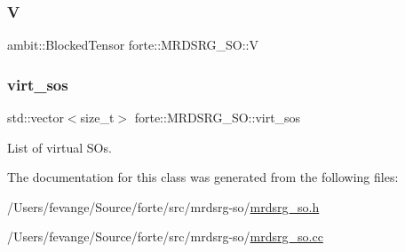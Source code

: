 \mbox{\label{classforte_1_1_m_r_d_s_r_g___s_o_a5282fcd5394254c50c626ad36dd6c0cd}} 
\subsubsection{\texorpdfstring{V}{V}}
{\footnotesize\ttfamily ambit\+::\+Blocked\+Tensor forte\+::\+M\+R\+D\+S\+R\+G\+\_\+\+S\+O\+::V\hspace{0.3cm}{\ttfamily [protected]}}

\mbox{\label{classforte_1_1_m_r_d_s_r_g___s_o_a1788c04a6db550d8a2f629b3a10c7b10}} 
\subsubsection{\texorpdfstring{virt\+\_\+sos}{virt\_sos}}
{\footnotesize\ttfamily std\+::vector$<$size\+\_\+t$>$ forte\+::\+M\+R\+D\+S\+R\+G\+\_\+\+S\+O\+::virt\+\_\+sos\hspace{0.3cm}{\ttfamily [protected]}}



List of virtual S\+Os. 



The documentation for this class was generated from the following files\+:\begin{DoxyCompactItemize}
\item 
/\+Users/fevange/\+Source/forte/src/mrdsrg-\/so/\mbox{\hyperlink{mrdsrg__so_8h}{mrdsrg\+\_\+so.\+h}}\item 
/\+Users/fevange/\+Source/forte/src/mrdsrg-\/so/\mbox{\hyperlink{mrdsrg__so_8cc}{mrdsrg\+\_\+so.\+cc}}\end{DoxyCompactItemize}
